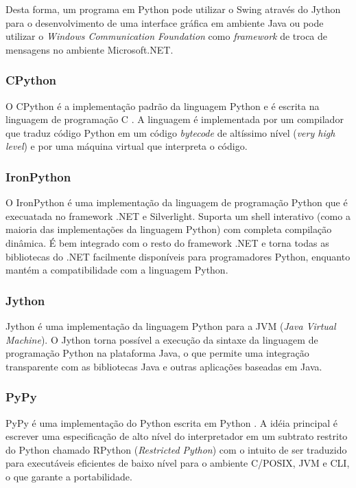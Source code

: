Desta forma, um programa em Python pode utilizar o Swing através do Jython para o desenvolvimento de uma interface gráfica em ambiente Java ou pode utilizar o \emph{Windows Communication Foundation} como \emph{framework} de troca de mensagens no ambiente Microsoft.NET.

\subsubsection{CPython}

O CPython é a implementação padrão da linguagem Python e é escrita na linguagem de programação C \cite[p.6]{pypy}. A linguagem é implementada por um compilador que traduz código Python em um código \emph{bytecode} de altíssimo nível (\emph{very high level}) e por uma máquina virtual que interpreta o código.

\subsubsection{IronPython}

O IronPython \cite{ironpython} é uma implementação da linguagem de programação Python que é execuatada no framework .NET e Silverlight. Suporta um shell interativo (como a maioria das implementações da linguagem Python) com completa compilação dinâmica. É bem integrado com o resto do framework .NET e torna todas as bibliotecas do .NET facilmente disponíveis para programadores Python, enquanto mantém a compatibilidade com a linguagem Python.


\subsubsection{Jython}

Jython \cite{jython} é uma implementação da linguagem Python para a JVM (\emph{Java Virtual Machine}). O Jython torna possível a execução da sintaxe da linguagem de programação Python na plataforma Java, o que permite uma integração transparente com as bibliotecas Java e outras aplicações baseadas em Java. 

\subsubsection{PyPy}

PyPy é uma implementação do Python escrita em Python \cite[p. 7]{pypy}. A idéia principal é escrever uma especificação de alto nível do interpretador em um subtrato restrito do Python chamado RPython (\emph{Restricted Python}) com o intuito de ser traduzido para executáveis eficientes de baixo nível para o ambiente C/POSIX, JVM e CLI, o que garante a portabilidade. 

